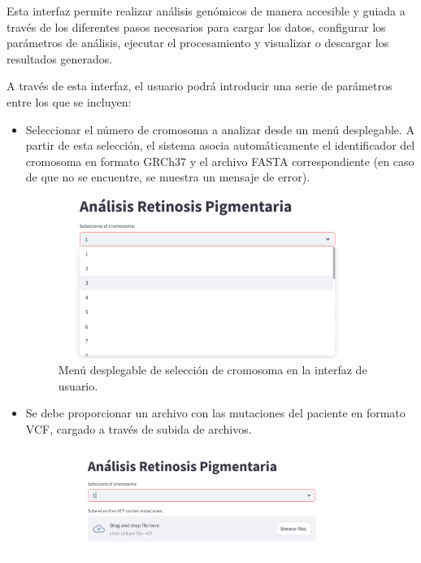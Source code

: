 \documentclass[11pt,spanish,listoffigures,listoftables]{tfgetsinf}
\begin{document}
Esta interfaz permite realizar análisis genómicos de manera accesible y guiada a través de los diferentes pasos necesarios para cargar los datos, configurar los parámetros de análisis, ejecutar el procesamiento y visualizar o descargar los resultados generados. 

 

A través de esta interfaz, el usuario podrá introducir una serie de parámetros entre los que se incluyen:  


\begin{itemize}
   \item Seleccionar el número de cromosoma a analizar desde un menú desplegable. A partir de esta selección, el sistema asocia automáticamente el identificador del cromosoma en formato GRCh37 y el archivo \acs{FASTA} correspondiente (en caso de que no se encuentre, se muestra un mensaje de error). 
   \begin{figure}[H]
      \centering
      \includegraphics[width=0.9\textwidth]{cromosoma_RP.png}
      \caption{Menú desplegable de selección de cromosoma en la interfaz de usuario.}
      \label{fig:etiqueta_opcional6}
   \end{figure}
   \item Se debe proporcionar un archivo con las mutaciones del paciente en formato \acs{VCF}, cargado a través de subida de archivos. 
   \begin{figure}[H]
      \centering
      \includegraphics[width=0.9\textwidth]{VCF_RP.png}

\end{figure}
\end{itemize}
\end{document}
